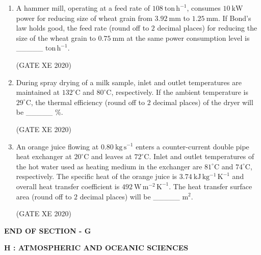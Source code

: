 \documentclass[12pt]{article}
\begin{document}
\begin{enumerate}
(GATE XE 2020)

\item A hammer mill, operating at a feed rate of $108\ \mathrm{ton\,h^{-1}}$, consumes $10\ \mathrm{kW}$ power for reducing size of wheat grain from $3.92\ \mathrm{mm}$ to $1.25\ \mathrm{mm}$. If Bond's law holds good, the feed rate (round off to $2$ decimal places) for reducing the size of the wheat grain to $0.75\ \mathrm{mm}$ at the same power consumption level is \_\_\_\_\_ $\mathrm{ton\,h^{-1}}$.  

(GATE XE 2020)

\item During spray drying of a milk sample, inlet and outlet temperatures are maintained at $132^{\circ}\mathrm{C}$ and $80^{\circ}\mathrm{C}$, respectively. If the ambient temperature is $29^{\circ}\mathrm{C}$, the thermal efficiency (round off to $2$ decimal places) of the dryer will be \_\_\_\_\_ \%. 

(GATE XE 2020)

\item An orange juice flowing at $0.80\ \mathrm{kg\,s^{-1}}$ enters a counter-current double pipe heat exchanger at $20^{\circ}\mathrm{C}$ and leaves at $72^{\circ}\mathrm{C}$. Inlet and outlet temperatures of the hot water used as heating medium in the exchanger are $81^{\circ}\mathrm{C}$ and $74^{\circ}\mathrm{C}$, respectively. The specific heat of the orange juice is $3.74\ \mathrm{kJ\,kg^{-1}\,K^{-1}}$ and overall heat transfer coefficient is $492\ \mathrm{W\,m^{-2}\,K^{-1}}$. The heat transfer surface area (round off to $2$ decimal places) will be \_\_\_\_\_ $\mathrm{m^{2}}$.  

(GATE XE 2020)

\end{enumerate}

\begin{center}
    \textbf{END OF SECTION - G}
\end{center}

\newpage
\begin{center}
    {\Large \textbf{H : ATMOSPHERIC AND OCEANIC SCIENCES} }
\end{center}
\end{document}
